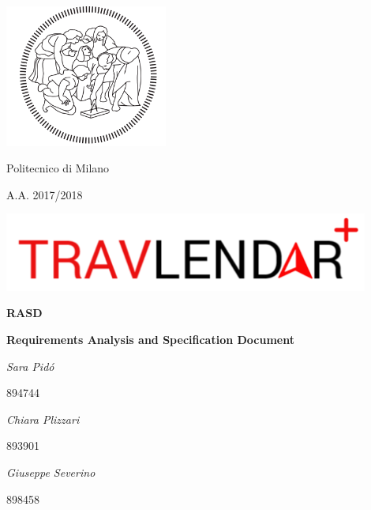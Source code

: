 \documentclass[12pt,titlepage]{article}
\begin{document}
\begin{titlepage}
\centering
\includegraphics[width=0.4\textwidth]{Logo}\par
	{{Politecnico di Milano} \par}
	{{A.A. 2017/2018} \par}
	\vspace{1.5cm}
	\includegraphics[width=0.9\textwidth]{LogoTravlendar}\par
	\vspace{1.5cm}
	{\Huge \textbf {RASD}\par}
	{ \textbf{Requirements Analysis and Specification Document} \par}
	\vspace{1.5cm}
	{\Large\itshape Sara Pid\'o  }{\Large   {  894744}\par}
	{\Large\itshape Chiara Plizzari }{\Large   {  893901}\par}
	{\Large\itshape Giuseppe Severino }{\Large   {  898458}\par}
	\vspace{2cm}
	\vfill
\end{titlepage}

\newpage\null\thispagestyle{empty}\newpage



\end{document}
